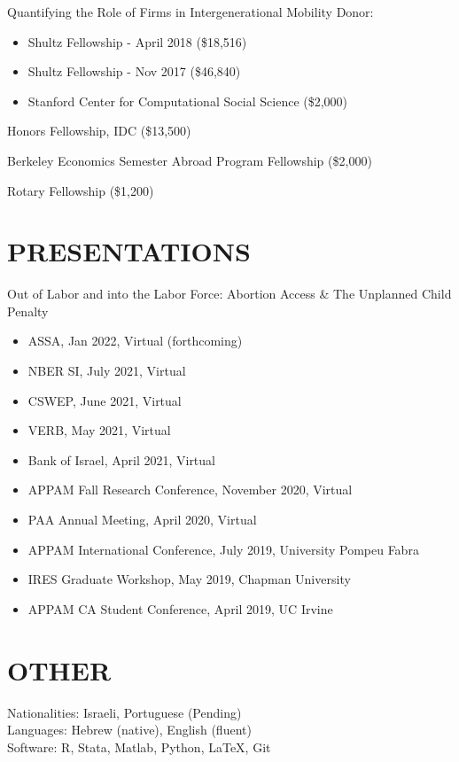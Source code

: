 \documentclass[margin]{res} %
\begin{document}
\begin{resume}
Quantifying the Role of Firms in Intergenerational Mobility
Donor: 
\begin{itemize}
	\item Shultz Fellowship - April 2018 (\$18,516)
	\item Shultz Fellowship - Nov 2017 (\$46,840)
	\item Stanford Center for Computational Social Science (\$2,000) 
\end{itemize}	

Honors Fellowship, IDC (\$13,500) 

Berkeley Economics Semester Abroad Program Fellowship (\$2,000) 

Rotary Fellowship (\$1,200) 

 
\section{PRESENTATIONS} 
\vspace{5mm} 
Out of Labor and into the Labor Force: Abortion Access \& The Unplanned Child Penalty
\begin{itemize}
	\item ASSA, Jan 2022, Virtual (forthcoming)
	\item NBER SI, July 2021, Virtual
	\item CSWEP, June 2021, Virtual
	\item VERB, May 2021, Virtual
	\item Bank of Israel, April 2021, Virtual
	\item APPAM Fall Research Conference, November 2020, Virtual
	\item PAA Annual Meeting, April 2020, Virtual
	\item APPAM International Conference, July 2019, University Pompeu Fabra
	\item IRES Graduate Workshop, May 2019, Chapman University
	\item APPAM CA Student Conference, April 2019, UC Irvine
\end{itemize}

 
\section{OTHER} 
Nationalities: Israeli, Portuguese (Pending) \\
Languages: Hebrew (native), English (fluent) \\
Software: R, Stata, Matlab, Python, \LaTeX, Git


\end{resume}
\end{document}
